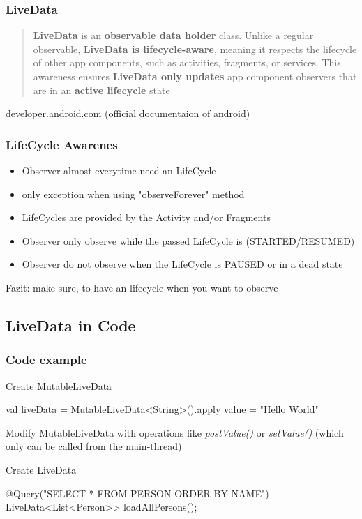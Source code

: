 \documentclass{beamer}
\begin{document}
	
	\begin{frame}
		\frametitle{LiveData}
		\begin{quote}\textbf{LiveData} is an \textbf{observable data holder} class. Unlike a regular observable, \textbf{LiveData is lifecycle-aware}, meaning it respects the lifecycle of other app components, such as activities, fragments, or services. This awareness ensures \textbf{LiveData only updates} app component observers that are in an \textbf{active lifecycle} state\end{quote} developer.android.com \linebreak(official documentaion of android)
	\end{frame}
	

	\begin{frame}
	\frametitle{LifeCycle Awarenes}
	\begin{itemize}
	\item Observer almost everytime need an LifeCycle
	\item only exception when using "observeForever" method
	\item LifeCycles are provided by the Activity and/or Fragments 
	\item Observer only observe while the passed LifeCycle is (STARTED/RESUMED)
	\item Observer do not observe when the LifeCycle is PAUSED or in a dead state
	\end{itemize}
	Fazit: make sure, to have an lifecycle when you want to observe
	\end{frame}	
	
	\subsection[LiveData in Code]{LiveData in Code}
	\begin{frame}[fragile]
	\frametitle{Code example}
		\begin{block}{Create MutableLiveData}
		\begin{spverbatim}
			val liveData = MutableLiveData<String>().apply{
			value = "Hello World"
			}
		\end{spverbatim}
		Modify MutableLiveData with operations like \textit{postValue()} or \textit{setValue()} 		(which only can be called from the main-thread)
		\end{block}
		\begin{block}{Create LiveData}
		\begin{spverbatim}
			@Query("SELECT * FROM PERSON ORDER BY NAME")
			LiveData<List<Person>> loadAllPersons();
		\end{spverbatim}
	\end{block}
	\end{frame}
	
\end{document}
